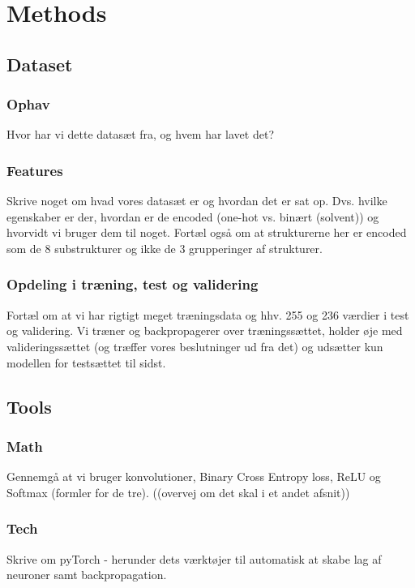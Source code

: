 \section{Methods}

\subsection{Dataset}
\subsubsection{Ophav}
Hvor har vi dette datasæt fra, og hvem har lavet det?

\subsubsection{Features}
Skrive noget om hvad vores datasæt er og hvordan det er sat op. Dvs. hvilke egenskaber er der, hvordan er de encoded (one-hot vs. binært (solvent)) og hvorvidt vi bruger dem til noget. Fortæl også om at strukturerne her er encoded som de 8 substrukturer og ikke de 3 grupperinger af strukturer.

\subsubsection{Opdeling i træning, test og validering}
Fortæl om at vi har rigtigt meget træningsdata og hhv. 255 og 236 værdier i test og validering. Vi træner og backpropagerer over træningssættet, holder øje med valideringssættet (og træffer vores beslutninger ud fra det) og udsætter kun modellen for testsættet til sidst.

\subsection{Tools}
\subsubsection{Math}
Gennemgå at vi bruger konvolutioner, Binary Cross Entropy loss, ReLU og Softmax (formler for de tre). ((overvej om det skal i et andet afsnit))

\subsubsection{Tech}
Skrive om pyTorch - herunder dets værktøjer til automatisk at skabe lag af neuroner samt backpropagation. 

